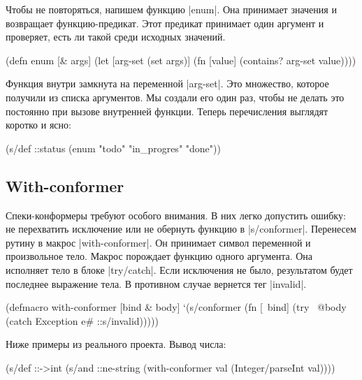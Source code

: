 Чтобы не повторяться, напишем функцию \spverb|enum|. Она принимает значения и
возвращает функцию-предикат. Этот предикат принимает один аргумент и проверяет,
есть ли такой среди исходных значений.

\begin{english}
  \begin{clojure}
(defn enum [& args]
  (let [arg-set (set args)]
    (fn [value]
      (contains? arg-set value))))
  \end{clojure}
\end{english}

Функция внутри замкнута на переменной \spverb|arg-set|. Это множество, которое
получили из списка аргументов. Мы создали его один раз, чтобы не делать это
постоянно при вызове внутренней функции. Теперь перечисления выглядят коротко и
ясно:

\begin{english}
  \begin{clojure}
(s/def ::status
  (enum "todo" "in_progres" "done"))
  \end{clojure}
\end{english}

\subsection{With-conformer}

Спеки-конформеры требуют особого внимания. В них легко допустить ошибку: не
перехватить исключение или не обернуть функцию в \spverb|s/conformer|. Перенесем
рутину в макрос \spverb|with-conformer|. Он принимает символ переменной и
произвольное тело. Макрос порождает функцию одного аргумента. Она исполняет тело
в блоке \spverb|try/catch|. Если исключения не было, результатом будет последнее
выражение тела. В противном случае вернется тег \spverb|invalid|.

\begin{english}
  \begin{clojure}
(defmacro with-conformer
  [bind & body]
  `(s/conformer
    (fn [~bind]
      (try
        ~@body
        (catch Exception e#
          ::s/invalid)))))
  \end{clojure}
\end{english}

\noindent
Ниже примеры из реального проекта. Вывод числа:

\begin{english}
  \begin{clojure}
(s/def ::->int
  (s/and
   ::ne-string
   (with-conformer val
     (Integer/parseInt val))))
  \end{clojure}
\end{english}

